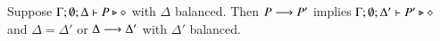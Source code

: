\smallskip

\begin{theorem}\label{t:sr}%
%
			Suppose $\Gamma; \emptyset; \Delta \vdash P \triangleright \diamond$
			with
			$\Delta$ balanced. 
			Then $P \longrightarrow P'$ implies $\Gamma; \emptyset; \Delta'  \vdash P' \triangleright \diamond$
			and $\Delta = \Delta'$ or $\Delta \longrightarrow \Delta'$
			with $\Delta'$ balanced. 
\end{theorem}
